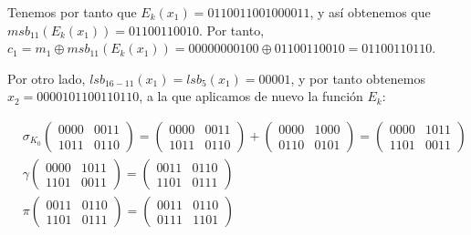 \documentclass[fleqn]{article}
\begin{document}
    Tenemos por tanto que $E_k(x_1) = 0110011001000011$, y así obtenemos que $msb_{11}(E_k(x_1)) = 01100110010$. Por tanto, 
    $c_1 = m_1 \oplus msb_{11}(E_k(x_1)) = 00000000100 \oplus 01100110010 = 01100110110$.

    Por otro lado, $lsb_{16-11}(x_1) = lsb_5(x_1) = 00001$, y por tanto obtenemos $x_2 = 0000101100110110$, a la que aplicamos de nuevo 
    la función $E_k$:

    \begin{equation*}
        \begin{aligned}
            &\sigma_{K_0}
            \begin{pmatrix}
                0000 & 0011 \\
                1011 & 0110
            \end{pmatrix} = 
            \begin{pmatrix}
                0000 & 0011 \\
                1011 & 0110
            \end{pmatrix} + 
            \begin{pmatrix}
                0000 & 1000 \\
                0110 & 0101
            \end{pmatrix} = 
            \begin{pmatrix}
                0000 & 1011 \\
                1101 & 0011
            \end{pmatrix} \\
            &\gamma \begin{pmatrix}
                0000 & 1011 \\
                1101 & 0011
            \end{pmatrix} =
            \begin{pmatrix}
                0011 & 0110 \\
                1101 & 0111
            \end{pmatrix} \\
            &\pi \begin{pmatrix}
                0011 & 0110 \\
                1101 & 0111
            \end{pmatrix} =
            \begin{pmatrix}
                0011 & 0110 \\
                0111 & 1101
            \end{pmatrix} \\

\end{aligned}
\end{equation*}
\end{document}
